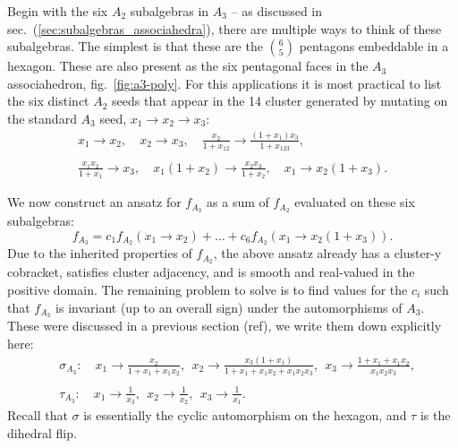 \documentclass[11pt]{article}
\def\nl{\nonumber\\}
\def\nn{\nonumber}
\begin{document}
Begin with the six $A_2$ subalgebras in $A_3$ -- as discussed in sec.~(\ref{sec:subalgebras_associahedra}), there are multiple ways to think of these subalgebras. The simplest is that these are the $\binom{6}{5}$ pentagons embeddable in a hexagon. These are also present as the six pentagonal faces in the $A_3$ associahedron, fig.~\ref{fig:a3-poly}. For this applications it is most practical to list the six distinct $A_2$ seeds that appear in the 14 cluster generated by mutating on the standard $A_3$ seed, $x_1 \to x_2 \to x_3$:
\begin{equation}\label{eq:a2-in-a3}
\begin{gathered}
	x_1 \to x_2, \quad 
	x_2 \to x_3, \quad 
	\frac{x_2}{1+x_{12}}\to \frac{\left(1+x_1\right) x_3}{1+x_{123}},\\ \\
	\frac{x_1 x_2}{1+x_1}\to x_3,\quad 
	x_1 \left(1+x_2\right)\to \frac{x_2 x_3}{1+x_2},\quad
	 x_1\to x_2 \left(1+x_3\right).
\end{gathered}	
\end{equation}

We now construct an ansatz for $f_{A_3}$ as a sum of $f_{A_2}$ evaluated on these six subalgebras:
\begin{equation}
	f_{A_3} = c_1 f_{A_2}(x_1 \to x_2) + \ldots + c_6 f_{A_2}(x_1\to x_2 \left(1+x_3\right)). 
\end{equation}	
Due to the inherited properties of $f_{A_2}$, the above ansatz already has a cluster-y cobracket, satisfies cluster adjacency, and is smooth and real-valued in the positive domain. The remaining problem to solve is to find values for the $c_i$ such that $f_{A_3}$ is invariant (up to an overall sign) under the automorphisms of $A_3$. These were discussed in a previous section (ref), we write them down explicitly here:
\begin{align}
	&\sigma_{A_3}:\quad x_1 \to \frac{x_2}{1+x_1 + x_1 x_2}, ~~x_2 \to \frac{x_3(1+x_1)}{1+x_1 + x_1x_2 +x_1x_2x_3},~~ x_3 \to \frac{1+x_1 + x_1 x_2}{x_1x_2x_3},\nl \\
	&\tau_{A_3}:\quad x_1 \to \frac{1}{x_3}, ~~x_2\to\frac{1}{x_2},~~x_3\to \frac{1}{x_1}.\nn
\end{align}
Recall that $\sigma$ is essentially the cyclic automorphism on the hexagon, and $\tau$ is the dihedral flip. 
\end{document}
